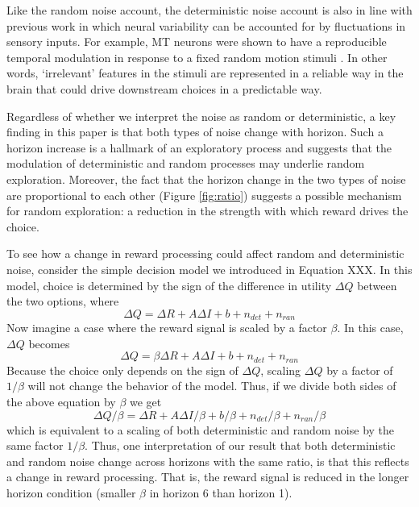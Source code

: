 \documentclass[12pt]{article}
\begin{document}
{Like the random noise account, the deterministic noise account is also in line with previous work in which neural variability can be accounted for by fluctuations in sensory inputs. For example, MT neurons were shown to have a reproducible temporal modulation in response to a fixed random motion stimuli \citep{Bair1996}. In other words, `irrelevant' features in the stimuli are represented in a reliable way in the brain that could drive downstream choices in a predictable way. 


Regardless of whether we interpret the noise as random or deterministic, a key finding in this paper is that both types of noise change with horizon. Such a horizon increase is a hallmark of an exploratory process and suggests that the modulation of deterministic and random processes may underlie random exploration. Moreover, the fact that the horizon change in the two types of noise are proportional to each other (Figure \ref{fig:ratio}) suggests a possible mechanism for random exploration: a reduction in the strength with which reward drives the choice. 

To see how a change in reward processing could affect random and deterministic noise, consider the simple decision model we introduced in Equation XXX. In this model, choice is determined by the sign of the difference in utility $\Delta Q$ between the two options, where
\begin{equation}
	\label{eq:noise1}
	\Delta Q = 
	\Delta R + A \Delta I + b + n_{det} + n_{ran}
\end{equation}
Now imagine a case where the reward signal is scaled by a factor $\beta$.  In this case, $\Delta Q$ becomes
\begin{equation}
	\label{eq:noise2}
	\Delta Q = 
	\beta \Delta R + A \Delta I + b + n_{det} + n_{ran}
\end{equation}
Because the choice only depends on the sign of $\Delta Q$, scaling $\Delta Q$ by a factor of $1/\beta$ will not change the behavior of the model.  Thus, if we divide both sides of the above equation by $\beta$ we get
\begin{equation}
	\label{eq:noise3}
	\Delta Q / \beta = 
	\Delta R + A \Delta I / \beta + b / \beta + n_{det} / \beta + n_{ran} / \beta
\end{equation}
which is equivalent to a scaling of both deterministic and random noise by the same factor $1/\beta$. Thus, one interpretation of our result that both deterministic and random noise change across horizons with the same ratio, is that this reflects a change in reward processing. That is, the reward signal is reduced in the longer horizon condition (smaller $\beta$ in horizon 6 than horizon 1).  %

}
\end{document}
